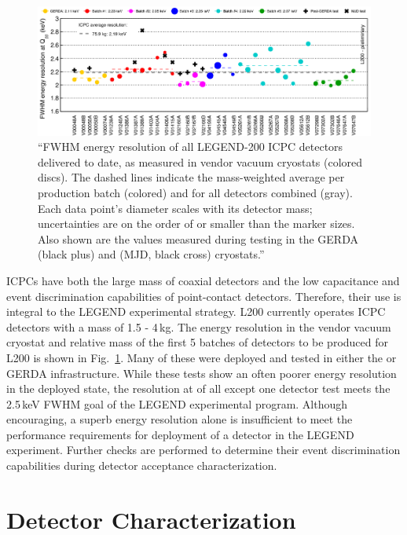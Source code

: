 \begin{figure}[htb]
	\centering
	\includegraphics[width=6in]{figs/legend/icpc_resolution.pdf}
	\caption{``FWHM energy resolution of all LEGEND-200 ICPC detectors delivered to date, as measured in vendor vacuum cryostats (colored discs). The dashed lines indicate the mass-weighted average per production batch (colored) and for all detectors combined (gray). Each data point's diameter scales with its detector mass; uncertainties are on the order of or smaller than the marker sizes. Also shown are the values measured during testing in the GERDA (black plus) and {\MJDEMit} (MJD, black cross) cryostats.''~\cite{legend_pcdr}}
	\label{fig:legend_icpc_res}
\end{figure}

ICPCs have both the large mass of coaxial detectors and the low capacitance and event discrimination capabilities of point-contact detectors. Therefore, their use is integral to the LEGEND experimental strategy. L200 currently operates ICPC detectors with a mass of 1.5 - 4\,kg. The energy resolution in the vendor vacuum cryostat and relative mass of the first 5 batches of detectors to be produced for L200 is shown in Fig.~\ref{fig:legend_icpc_res}. Many of these were deployed and tested in either the {\MJDEMit} or GERDA infrastructure. While these tests show an often poorer energy resolution in the deployed state, the resolution at \Qbb{} of all except one detector test meets the 2.5\,keV FWHM goal of the LEGEND experimental program. Although encouraging, a superb energy resolution alone is insufficient to meet the performance requirements for deployment of a detector in the LEGEND experiment. Further checks are performed to determine their event discrimination capabilities during detector acceptance characterization.

\section{Detector Characterization}

